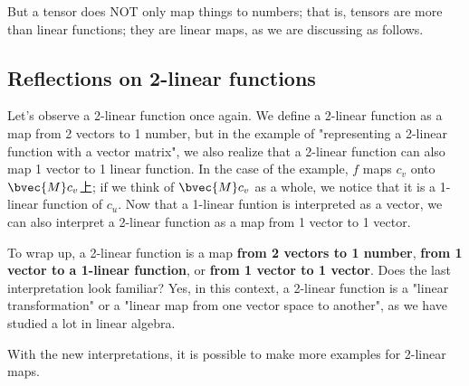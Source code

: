 But a tensor does NOT only map things to numbers; that is, tensors are more than linear functions; they are linear maps, as we are discussing as follows. 

\subsection{Reflections on 2-linear functions}
Let's observe a 2-linear function once again. We define a 2-linear function as a map from 2 vectors to 1 number, but in the example of "representing a 2-linear function with a vector matrix", we also realize that a 2-linear function can also map 1 vector to 1 linear function. In the case of the example, $f$ maps $c_v$ onto $\bvec{M}c_v$上; if we think of $\bvec{M}c_v$ as a whole, we notice that it is a 1-linear function of $c_u$. Now that a 1-linear funtion is interpreted as a vector, we can also interpret a 2-linear function as a map from 1 vector to 1 vector. 

To wrap up, a 2-linear function is a map \textbf{from 2 vectors to 1 number}, \textbf{from 1 vector to a 1-linear function}, or \textbf{from 1 vector to 1 vector}. Does the last interpretation look familiar? Yes, in this context, a 2-linear function is a "linear transformation" or a "linear map from one vector space to another", as we have studied a lot in linear algebra. 

With the new interpretations, it is possible to make more examples for 2-linear maps. 

